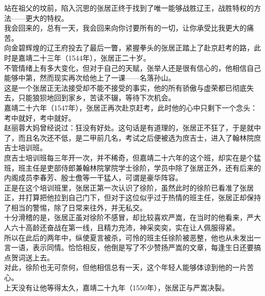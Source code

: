 \begin{multicols}{\theparacolNo}
站在祖父的坟前，陷入沉思的张居正终于找到了唯一能够战胜辽王，战胜特权的方法——更大的特权。\\

我会回来的，总有一天，我会回来向你讨要所有的一切，让你承受比我更大的痛苦。\\

向金碧辉煌的辽王府投去了最后一瞥，紧握拳头的张居正踏上了赴京赶考的路，此时是嘉靖二十三年（1544年），张居正二十岁。\\

不管情绪上有多大变化，但对于自己的天赋，张举人还是很有信心的，他相信自己能够中第，然而现实再次给他上了一课——名落孙山。\\

这是一个张居正无法接受却不能不接受的事实，他的所有骄傲与虚荣都已彻底失去，只能狼狈地回到家乡，苦读不辍，等待下次机会。\\

嘉靖二十六年（1547年），张居正再次赴京赶考，此时他的心中只剩下一个念头：考中就好，考中就好。\\

赵丽蓉大妈曾经说过：狂没有好处。这句话是有道理的，张居正不狂了，于是就中了，而且名次还不低，是二甲前几名，考试之后便被选为庶吉士，进入了翰林院庶吉士培训班。\\

庶吉士培训班每三年开一次，并不稀奇，但嘉靖二十六年的这个班，却实在是个猛班，班主任是吏部侍郎兼翰林院掌院学士徐阶，学员中除了张居正外，还有后来的内阁成员李春芳、殷士儋等一干猛人，可谓是豪华阵容。\\

正是在这个培训班里，张居正第一次认识了徐阶，虽然此时的徐阶已看准了张居正，并打算把他拉到自己门下，但对于这位似乎过于热情的班主任，张居正却保持了相当的警惕，除了日常来往外，并无私交。\\

十分滑稽的是，张居正虽对徐阶不感冒，却比较喜欢严嵩，在当时的他看来，严大人六十高龄还奋战在第一线，且精力充沛，神采奕奕，实在让人佩服得紧。\\

所以在此后的两年中，纵使夏言被杀，可怜的班主任徐阶被恶整，他也从未发出一言一语，表示同情。恰恰相反，他倒是写了不少赞扬严嵩的文章，每逢生日还要搞点贺词送上去。\\

对此，徐阶也无可奈何，但他相信总有一天，这个年轻人能够体谅到他的一片苦心。\\

上天没有让他等得太久，嘉靖二十九年（1550年），张居正与严嵩决裂。\\


\end{multicols}
